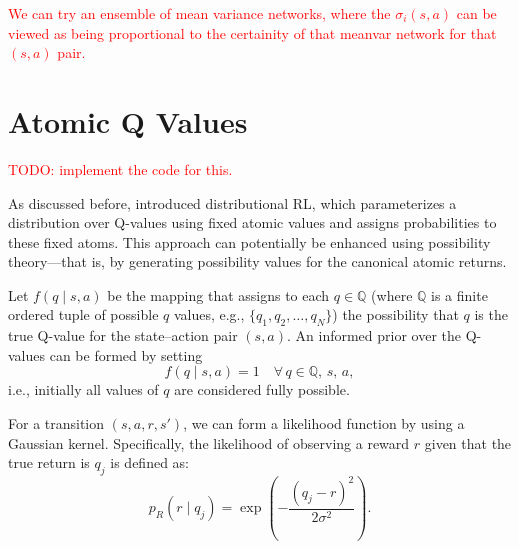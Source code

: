 \documentclass[12pt,a4paper]{report}
\newcommand\myworries[1]{\textcolor{red}{#1}}
\begin{document}
%
%
%
%
%


\myworries{We can try an ensemble of mean variance networks, where the $\sigma_i(s, a)$ can be viewed as being proportional to the certainity of that meanvar network for that $(s,a)$ pair.}

\section{Atomic Q Values}
\myworries{TODO: implement the code for this.}\par
As discussed before, \cite{bellemare2017} introduced distributional RL, which parameterizes a distribution over Q-values using fixed atomic values and assigns probabilities to these fixed atoms. This approach can potentially be enhanced using possibility theory—that is, by generating possibility values for the canonical atomic returns.

Let \( f(q \mid s, a) \) be the mapping that assigns to each \( q \in \mathbb{Q} \) (where \(\mathbb{Q}\) is a finite ordered tuple of possible \(q\) values, e.g., \(\{q_1, q_2, \dots, q_N\}\)) the possibility that \(q\) is the true Q-value for the state–action pair \((s,a)\). An informed prior over the Q-values can be formed by setting 
\[
f(q \mid s, a) = 1 \quad \forall\, q \in \mathbb{Q},\, s,\, a,
\]
i.e., initially all values of \(q\) are considered fully possible.

For a transition \((s, a, r, s')\), we can form a likelihood function by using a Gaussian kernel. Specifically, the likelihood of observing a reward \(r\) given that the true return is \(q_j\) is defined as:
\[
p_{R}(r \mid q_j) = \exp\!\left(-\frac{(q_j - r)^2}{2\sigma^2}\right).
\]
\end{document}
